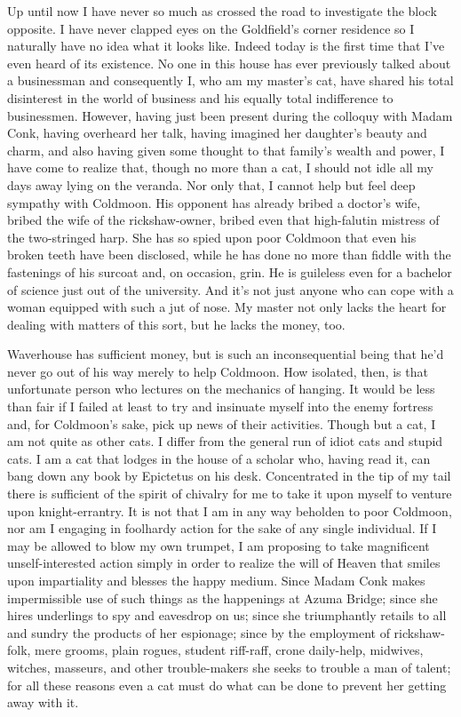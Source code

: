 \documentclass{book}
\begin{document}
Up until now I have never so much as crossed the road to investigate the
block opposite. I have never clapped eyes on the Goldfield's corner
residence so I naturally have no idea what it looks like. Indeed today
is the first time that I've even heard of its existence. No one in this
house has ever previously talked about a businessman and consequently I,
who am my master's cat, have shared his total disinterest in the world
of business and his equally total indifference to businessmen. However,
having just been present during the colloquy with Madam Conk, having
overheard her talk, having imagined her daughter's beauty and charm, and
also having given some thought to that family's wealth and power, I have
come to realize that, though no more than a cat, I should not idle all
my days away lying on the veranda. Nor only that, I cannot help but feel
deep sympathy with Coldmoon. His opponent has already bribed a doctor's
wife, bribed the wife of the rickshaw-owner, bribed even that
high-falutin mistress of the two-stringed harp. She has so spied upon
poor Coldmoon that even his broken teeth have been disclosed, while he
has done no more than fiddle with the fastenings of his surcoat and, on
occasion, grin. He is guileless even for a bachelor of science just out
of the university. And it's not just anyone who can cope with a woman
equipped with such a jut of nose. My master not only lacks the heart for
dealing with matters of this sort, but he lacks the money, too.

Waverhouse has sufficient money, but is such an inconsequential being
that he'd never go out of his way merely to help Coldmoon. How isolated,
then, is that unfortunate person who lectures on the mechanics of
hanging. It would be less than fair if I failed at least to try and
insinuate myself into the enemy fortress and, for Coldmoon's sake, pick
up news of their activities. Though but a cat, I am not quite as other
cats. I differ from the general run of idiot cats and stupid cats. I am
a cat that lodges in the house of a scholar who, having read it, can
bang down any book by Epictetus on his desk. Concentrated in the tip of
my tail there is sufficient of the spirit of chivalry for me to take it
upon myself to venture upon knight-errantry. It is not that I am in any
way beholden to poor Coldmoon, nor am I engaging in foolhardy action for
the sake of any single individual. If I may be allowed to blow my own
trumpet, I am proposing to take magnificent unself-interested action
simply in order to realize the will of Heaven that smiles upon
impartiality and blesses the happy medium. Since Madam Conk makes
impermissible use of such things as the happenings at Azuma Bridge;
since she hires underlings to spy and eavesdrop on us; since she
triumphantly retails to all and sundry the products of her espionage;
since by the employment of rickshaw-folk, mere grooms, plain rogues,
student riff-raff, crone daily-help, midwives, witches, masseurs, and
other trouble-makers she seeks to trouble a man of talent; for all these
reasons even a cat must do what can be done to prevent her getting away
with it.
\end{document}
